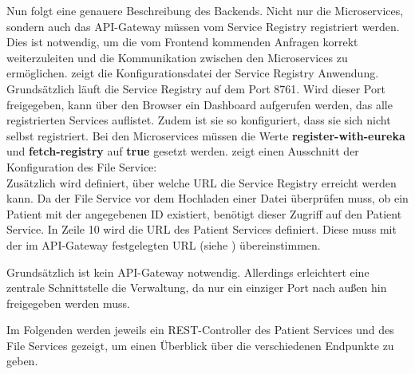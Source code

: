     Nun folgt eine genauere Beschreibung des Backends. Nicht nur die Microservices, sondern auch das API-Gateway
    müssen vom Service Registry registriert werden. Dies ist notwendig, um die vom Frontend kommenden Anfragen korrekt weiterzuleiten und die Kommunikation zwischen den Microservices zu ermöglichen.  zeigt die Konfigurationsdatei der Service Registry Anwendung. \\
    
    

    Grundsätzlich läuft die Service Registry auf dem Port 8761. Wird dieser Port freigegeben, kann über den Browser ein Dashboard aufgerufen werden, das alle registrierten Services auflistet. Zudem ist sie so konfiguriert, dass sie sich nicht selbst registriert. Bei den Microservices müssen die Werte \textbf{register-with-eureka} und \textbf{fetch-registry} auf \textbf{true} gesetzt werden.  zeigt einen Ausschnitt der Konfiguration des File Service: \\

    

    Zusätzlich wird definiert, über welche URL die Service Registry erreicht werden kann. Da der File Service vor dem Hochladen einer Datei überprüfen muss, ob ein Patient mit der angegebenen ID existiert, benötigt dieser Zugriff auf den Patient Service.
    In Zeile 10 wird die URL des Patient Services definiert. Diese muss mit der im API-Gateway festgelegten URL (siehe ) übereinstimmen.

    Grundsätzlich ist kein API-Gateway notwendig. Allerdings erleichtert eine zentrale Schnittstelle die Verwaltung, da nur ein einziger Port nach außen hin freigegeben werden muss. 

    Im Folgenden werden jeweils ein REST-Controller des Patient Services und des File Services gezeigt, um einen Überblick über die verschiedenen Endpunkte zu geben. \\

    

